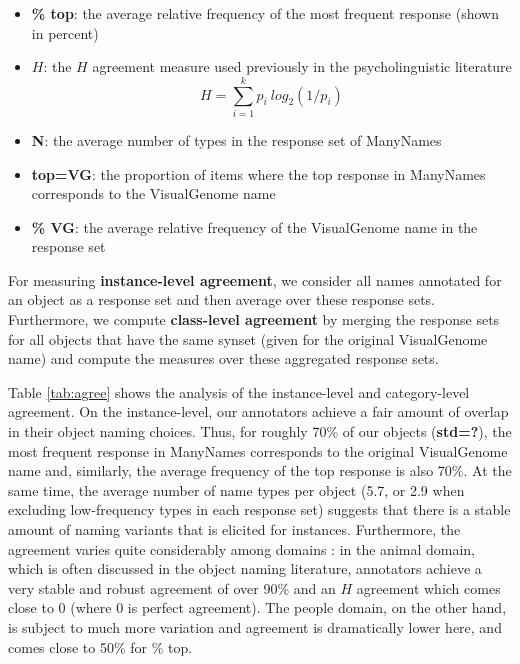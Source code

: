 \begin{itemize}
\item \textbf{\% top}: the average relative frequency of the most frequent response (shown in percent)
\item \textbf{$H$}: the $H$ agreement measure used previously in the psycholinguistic literature
\begin{equation}
H = \sum_{i=1}^k p_i\ log_2(1/p_i)
\end{equation}

\item \textbf{N}: the average number of types in the response set of ManyNames
\item \textbf{top=VG}: the proportion of items where the top response in ManyNames corresponds to the VisualGenome name
\item \textbf{\% VG}: the average relative frequency of the VisualGenome name in the response set

\end{itemize}

For measuring \textbf{instance-level agreement}, we consider all names annotated for an object as a response set and then average over these response sets. Furthermore, we compute \textbf{class-level agreement} by merging the response sets for all objects that have the same synset (given for the original VisualGenome name) and compute the measures over these aggregated response sets.


Table \ref{tab:agree} shows the analysis of the instance-level and category-level agreement.
On the instance-level, our annotators achieve a fair amount of overlap in their object naming choices. 
Thus, for roughly 70\% of our objects (\textbf{std=?}), the most frequent response in ManyNames corresponds to the original VisualGenome name and, similarly, the average frequency of the top response is also 70\%. 
At the same time, the average number of name types per object (5.7, or 2.9 when excluding low-frequency types in each response set) suggests that there is a stable amount of naming variants that is elicited for instances. 
Furthermore, the agreement varies quite considerably among domains :  in the animal domain, which is often discussed in the object naming literature, annotators achieve a very stable and robust agreement of over 90\% and an $H$ agreement which comes close to 0 (where 0 is perfect agreement). 
The people domain, on the other hand, is subject to much more variation and agreement is dramatically lower here, and comes close to 50\% for \% top.



